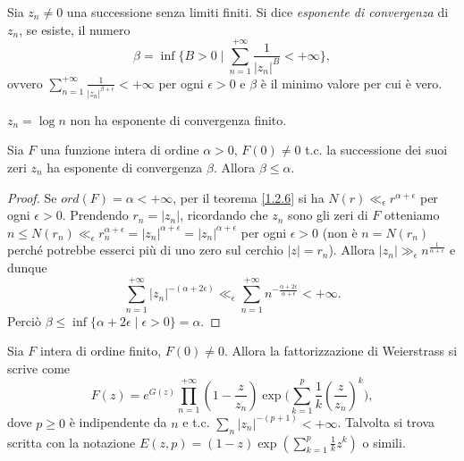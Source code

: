 \begin{defn}
  Sia $z_n\not=0$ una successione senza limiti finiti. Si dice \textit{esponente di convergenza} di $z_n$, se esiste, il numero $$\beta=\inf\{B>0 \mid \sum_{n=1}^{+\infty} \frac{1}{|z_n|^B}<+\infty\},$$
  ovvero $\displaystyle \sum_{n=1}^{+\infty} \frac{1}{|z_n|^{\beta+\epsilon}}<+\infty$ per ogni $\epsilon>0$ e $\beta$ è il minimo valore per cui è vero.
\end{defn}

\begin{ex}
  $z_n=\log{n}$ non ha esponente di convergenza finito.
\end{ex}

\begin{thm} \label{1.2.9}
  Sia $F$ una funzione intera di ordine $\alpha>0$, $F(0)\not=0$ t.c. la successione dei suoi zeri $z_n$ ha esponente di convergenza $\beta$. Allora $\beta \le \alpha$.
\end{thm}

\begin{proof}
  Se $ord(F)=\alpha<+\infty$, per il teorema \ref{1.2.6} si ha $N(r) \ll_{\epsilon} r^{\alpha+\epsilon}$ per ogni $\epsilon>0$.
  Prendendo $r_n=|z_n|$, ricordando che $z_n$ sono gli zeri di $F$ otteniamo $n \le N(r_n) \ll_{\epsilon} r_n^{\alpha+\epsilon}=|z_n|^{\alpha+\epsilon}=|z_n|^{\alpha+\epsilon}$ per ogni $\epsilon>0$ (non è $n=N(r_n)$ perché potrebbe esserci più di uno zero sul cerchio $|z|=r_n$). Allora $|z_n| \gg_{\epsilon} n^{\frac{1}{\alpha+\epsilon}}$ e dunque
  $$\sum_{n=1}^{+\infty} |z_n|^{-(\alpha+2\epsilon)} \ll_{\epsilon} \sum_{n=1}^{+\infty} n^{-\frac{\alpha+2\epsilon}{\alpha+\epsilon}}<+\infty.$$
  Perciò $\beta \le \inf\{\alpha+2\epsilon \mid \epsilon>0\}=\alpha$.
\end{proof}

\begin{thm} \label{wfatt}
  Sia $F$ intera di ordine finito, $F(0)\not=0$. Allora la fattorizzazione di Weierstrass si scrive come
  \begin{equation} \label{wfattoformula}
    F(z)=e^{G(z)} \prod_{n=1}^{+\infty} \left(1-\frac{z}{z_n}\right)\exp\Bigg(\sum_{k=1}^p\frac{1}{k}\left(\frac{z}{z_n}\right)^k\Bigg),
  \end{equation}
  dove $p \ge 0$ è indipendente da $n$ e t.c. $\displaystyle \sum_n |z_n|^{-(p+1)}<+\infty$. Talvolta si trova scritta con la notazione $\displaystyle E(z,p)=(1-z)\exp\left(\sum_{k=1}^p\frac{1}{k}z^k\right)$ o simili.
\end{thm}

